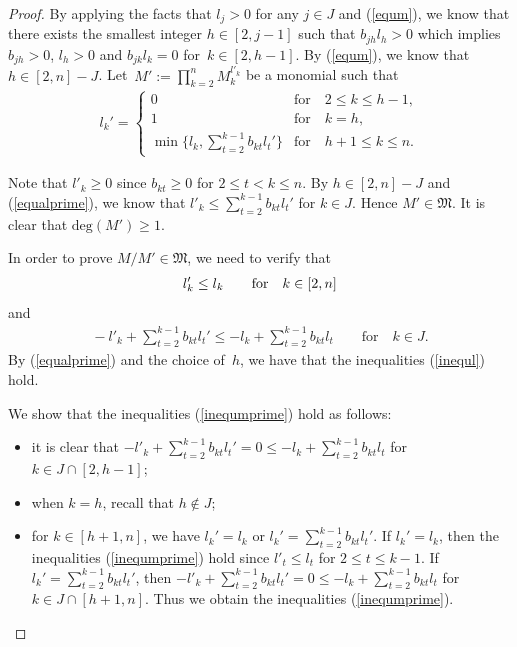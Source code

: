 \documentclass[pdftex]{sigma}
\numberwithin{equation}{section}
\begin{document}
\begin{proof}
By applying the facts that $l_j>0$ for any $j\in J$ and (\ref{equm}), we know that there exists the smallest integer $h\in[2,j-1]$ such that $b_{jh}l_h>0$ which implies $b_{jh}>0$, $l_h>0$ and $b_{jk}l_k=0$ for~$k\in[2,h-1]$. By (\ref{equm}), we know that $h\in[2,n]-J$.
Let~$M':=\prod\limits_{k=2}^{n}M_{k}^{l'_k}$ be a monomial such that
\begin{gather}\label{equalprime}
l_{k}'=
\begin{cases}
0 &\text{for}\quad 2\leq k\leq h-1,
\\%
1 &\text{for}\quad k=h,
\\
\min\bigg\{l_k,\sum\limits_{t=2}^{k-1}b_{kt}l_{t}'\bigg\}&\text{for}\quad h+1\leq k\leq n.
\end{cases}
\end{gather}



Note that $l'_k\geq0$ since $b_{kt}\geq0$ for $2\leq t< k\leq n$. By $h\in[2,n]-J$ and (\ref{equalprime}), we know that $l'_k\leq \sum\limits_{t=2}^{k-1}b_{kt}l_{t}'$ for $k\in J$. Hence $M'\in\mathfrak{M}$. It is clear that $\text{deg}(M')\geq1$.

In order to prove $M/M'\in\mathfrak{M}$, we need to verify that
\begin{gather}{\label{inequl}}
l'_k\leq l_k\qquad\text{for}\quad k\in[2,n]
\end{gather}
and
\begin{gather}\label{inequmprime}
{}-l'_k +\sum\limits_{t=2}^{k-1}b_{kt}l_{t}' \leq -l_k +\sum\limits_{t=2}^{k-1}b_{kt}l_{t}
\qquad\text{for}\quad k\in J.
\end{gather}
By (\ref{equalprime}) and the choice of~$h$, we have that the inequalities (\ref{inequl}) hold.

We show that the inequalities (\ref{inequmprime}) hold as follows:
\begin{itemize}\itemsep=0pt
 \item[(a)] it is clear that $-l'_k +\sum\limits_{t=2}^{k-1}b_{kt}l_{t}'=0\leq -l_k +\sum\limits_{t=2}^{k-1}b_{kt}l_{t}$ for $k\in J\cap [2,h-1]$;
 \item[(b)] when $k=h$, recall that $h\notin J$;
 \item[(c)] for $k\in[h+1,n]$, we have $l_{k}'=l_k$ or $l_{k}'=\sum\limits_{t=2}^{k-1}b_{kt}l_{t}'$. If $l_{k}'=l_k$, then the inequalities (\ref{inequmprime}) hold since $l'_t\leq l_{t}$ for $2\leq t\leq k-1$. If $l_{k}'=\sum\limits_{t=2}^{k-1}b_{kt}l_{t}'$, then $-l'_k +\sum\limits_{t=2}^{k-1}b_{kt}l_{t}' =0 \leq -l_k +\sum\limits_{t=2}^{k-1}b_{kt}l_{t}$ for $k\in J\cap[h+1,n]$. Thus we obtain the inequalities (\ref{inequmprime}).
\end{itemize}


\end{proof}
\end{document}
